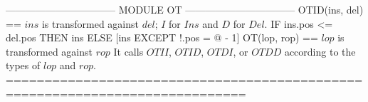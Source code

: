\documentclass{article}
\begin{document}
\begin{tla}
--------------------------------- MODULE OT ---------------------------------
OTID(ins, del) == \* $ins$ is transformed against $del$; $I$ for $Ins$ and $D$ for $Del$.
    IF ins.pos <= del.pos THEN ins
    ELSE [ins EXCEPT !.pos = @ - 1]
OT(lop, rop) == \* $lop$ is transformed against $rop$
    \* It calls $OTII$, $OTID$, $OTDI$, or $OTDD$ according to the types of $lop$ and $rop$.
=============================================================================
\end{tla}
\end{document}
